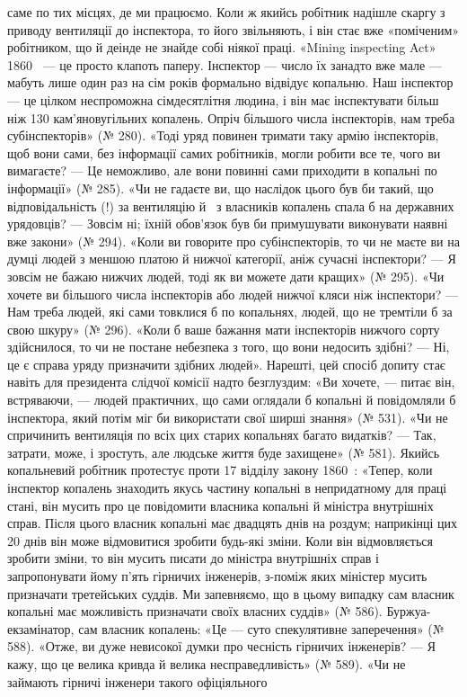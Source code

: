 \parcont{}  %
саме по тих місцях, де ми працюємо. Коли ж якийсь робітник
надішле скаргу з приводу вентиляції до інспектора, то його звільняють,
і він стає вже «поміченим» робітником, що й деінде не
знайде собі ніякої праці. «Mining inspecting Act» 1860~ —
це просто клапоть паперу. Інспектор — число їх занадто вже
мале — мабуть лише один раз на сім років формально відвідує
копальню. Наш інспектор — це цілком неспроможна сімдесятлітня
людина, і він має інспектувати більш ніж 130 кам’яновугільних
копалень. Опріч більшого числа інспекторів, нам треба
субінспекторів» (№ 280). «Тоді уряд повинен тримати таку армію
інспекторів, щоб вони сами, без інформації самих робітників,
могли робити все те, чого ви вимагаєте? — Це неможливо, але
вони повинні сами приходити в копальні по інформації» (№ 285).
«Чи не гадаєте ви, що наслідок цього був би такий, що відповідальність
(!) за вентиляцію й~ з власників копалень спала б
на державних урядовців? — Зовсім ні; їхній обов’язок був би
примушувати виконувати наявні вже закони» (№ 294). «Коли ви
говорите про субінспекторів, то чи не маєте ви на думці людей
з меншою платою й нижчої категорії, аніж сучасні інспектори? —
Я зовсім не бажаю нижчих людей, тоді як ви можете дати кращих»
(№ 295). «Чи хочете ви більшого числа інспекторів або
людей нижчої кляси ніж інспектори? — Нам треба людей, які
сами товклися б по копальнях, людей, що не тремтіли б за свою
шкуру» (№ 296). «Коли б ваше бажання мати інспекторів нижчого
сорту здійснилося, то чи не постане небезпека з того, що
вони недосить здібні? — Ні, це є справа уряду призначити
здібних людей». Нарешті, цей спосіб допиту стає навіть для
президента слідчої комісії надто безглуздим: «Ви хочете, — питає
він, встряваючи, — людей практичних, що сами оглядали б
копальні й повідомляли б інспектора, який потім міг би використати
свої ширші знання» (№ 531). «Чи не спричинить вентиляція
по всіх цих старих копальнях багато видатків? — Так,
затрати, може, і зростуть, але людське життя буде захищене»
(№ 581). Якийсь копальневий робітник протестує проти 17 відділу
закону 1860~: «Тепер, коли інспектор копалень знаходить
якусь частину копальні в непридатному для праці стані, він
мусить про це повідомити власника копальні й міністра внутрішніх
справ. Після цього власник копальні має двадцять днів на
роздум; наприкінці цих 20 днів він може відмовитися зробити
будь-які зміни. Коли він відмовляється зробити зміни, то він
мусить писати до міністра внутрішніх справ і запропонувати
йому п’ять гірничих інженерів, з-поміж яких міністер мусить
призначати третейських суддів. Ми запевняємо, що в цьому випадку
сам власник копальні має можливість призначати своїх
власних суддів» (№ 586). Буржуа-екзамінатор, сам власник
копалень: «Це — суто спекулятивне заперечення» (№ 588). «Отже,
ви дуже невисокої думки про чесність гірничих інженерів? —
Я кажу, що це велика кривда й велика несправедливість»
(№ 589). «Чи не займають гірничі інженери такого офіціяльного
\parbreak{}  %
